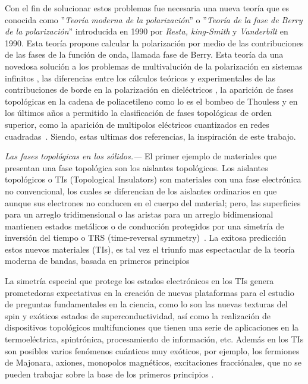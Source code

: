 Con el fin de solucionar estos problemas fue necesaria una nueva teoría que es conocida como ''\textit{Teoría moderna de la polarización}'' o ''\textit{Teoría de la fase de Berry de la polarización}'' introducida en 1990 por \textit{Resta, king-Smith} y \textit{Vanderbilt} en 1990. Esta teoría propone calcular la polarización por medio de las contribuciones de las fases de la función de onda, llamada fase de Berry. Esta teoría da una novedosa solución a los problemas de multivalución de la polarización en sistemas infinitos \cite{spaldin2012beginner}, las diferencias entre los cálculos teóricos y experimentales de las contribuciones de borde en la polarización en dieléctricos \cite{rabe2007modern}, la aparición de fases topológicas en la cadena de poliacetileno como lo es el bombeo de Thouless  y en los últimos años a permitido la clasificación de fases topológicas de orden superior, como la aparición de multipolos eléctricos cuantizados en redes cuadradas~\cite{Benalcazar2017}. Siendo, estas ultimas dos referencias, la inspiración de este trabajo.  


{\it Las fases topológicas en los sólidos.---} El primer ejemplo de materiales que presentan una fase topológica son los aislantes topológicos. Los aislantes topológicos o TIs (Topological Insulators) son materiales con una fase electrónica no convencional, los cuales se diferencian de los aislantes ordinarios en que aunque sus electrones no conducen en el cuerpo del material; pero, las superficies para un arreglo tridimensional o las aristas para un arreglo bidimensional mantienen estados metálicos o de conducción protegidos por una simetría de inversión del tiempo o TRS (time-reversal symmetry)~\cite{Shore2018}. La exitosa predicción estos nuevos materiales (TIs), es tal vez el triunfo mas espectacular de la teoría moderna de bandas, basada en primeros principios  

La simetría especial que protege los estados electrónicos en los TIs genera prometedoras expectativas  en la creación de nuevas plataformas para el estudio de preguntas fundamentales en la ciencia, como lo son las nuevas texturas del spin y exóticos estados de superconductividad,  así como la realización de dispositivos topológicos multifunciones que tienen una serie de aplicaciones en la termoeléctrica, spintrónica, procesamiento de información, etc. Además en los TIs son posibles varios fenómenos cuánticos muy exóticos, por ejemplo, los fermiones de Majonara, axiones, monopolos magnéticos, excitaciones fracciónales, que no se pueden trabajar sobre la base de los primeros principios \cite{Moore2010}.

